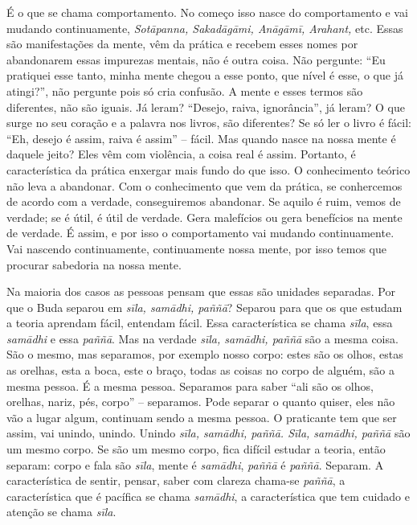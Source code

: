 É o que se chama comportamento. No começo isso nasce do
comportamento e vai mudando continuamente, \textit{Sot\=apanna,
Sakad\=ag\=ami, An\=ag\=amī, Arahant, }etc. Essas são manifestações
da mente, vêm da prática e recebem esses nomes por abandonarem essas
impurezas mentais, não é outra coisa. Não pergunte: “Eu pratiquei esse
tanto, minha mente chegou a esse ponto, que nível é esse, o que já
atingi?”, não pergunte pois só cria confusão. A mente e esses termos
são diferentes, não são iguais. Já leram? “Desejo, raiva, ignorância”,
já leram? O que surge no seu coração e a palavra nos livros, são
diferentes? Se só ler o livro é fácil: “Eh, desejo é assim, raiva é
assim” – fácil. Mas quando nasce na nossa mente é daquele jeito? Eles
vêm com violência, a coisa real é assim. Portanto, é característica da
prática enxergar mais fundo do que isso. O conhecimento teórico não
leva a abandonar. Com o conhecimento que vem da prática, se conhercemos
de acordo com a verdade, conseguiremos abandonar. Se aquilo é ruim,
vemos de verdade; se é útil, é útil de verdade. Gera malefícios ou gera
benefícios na mente de verdade. É assim, e por isso o comportamento vai
mudando continuamente. Vai nascendo continuamente, continuamente nossa
mente, por isso temos que procurar sabedoria na nossa mente. 

Na maioria dos casos as pessoas pensam que essas são unidades
separadas. Por que o Buda separou em \textit{sīla, sam\=adhi,
paññ\=a}? Separou para que os que estudam a teoria aprendam fácil,
entendam fácil. Essa característica se chama \textit{sīla}, essa
\textit{sam\=adhi} e essa \textit{paññ\=a}. Mas na verdade
\textit{sīla, sam\=adhi, paññ\=a }são a mesma coisa. São o mesmo,
mas separamos, por exemplo nosso corpo: estes são os olhos, estas as
orelhas, esta a boca, este o braço, todas as coisas no corpo de alguém,
são a mesma pessoa. É a mesma pessoa. Separamos para saber “ali são os
olhos, orelhas, nariz, pés, corpo” – separamos. Pode separar o quanto
quiser, eles não vão a lugar algum, continuam sendo a mesma pessoa. O
praticante tem que ser assim, vai unindo, unindo. Unindo
\textit{sīla, sam\=adhi, paññ\=a. Sīla, sam\=adhi, paññ\=a }são
um mesmo corpo. Se são um mesmo corpo, fica difícil estudar a teoria,
então separam: corpo e fala são \textit{sīla}, mente é
\textit{sam\=adhi}, \textit{paññ\=a} é \textit{paññ\=a}. Separam. A
característica de sentir, pensar, saber com clareza chama-se
\textit{paññ\=a}, a característica que é pacífica se chama
\textit{sam\=adhi}, a característica que tem cuidado e atenção se chama
\textit{sīla}. 


